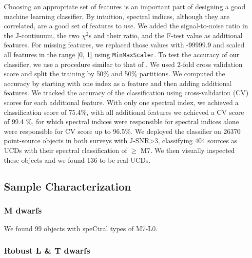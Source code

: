\documentclass[manuscript]{aastex63}
\begin{document}
Choosing an appropriate set of features is an important part of designing a good machine learning classifier. By intuition, spectral indices, although they are correlated, are a good set of features to use. We added the signal-to-noise ratio in the J-continuum, the two $\chi^2$s and their ratio, and the F-test value as additional features. For missing features, we replaced those values with -99999.9 and scaled all features in the range [0, 1] using \texttt{MinMaxScaler}. To test the accuracy of our classifier, we use a procedure similar to that of \citep{2017AJ....153...73M}. We used 2-fold cross validation score and split the training by 50\% and 50\% partitions. We computed the accuracy by starting with one index as a feature and then adding additional features. We tracked the accuracy of the classification using cross-validation (CV) scores for each additional feature. With only one spectral index, we achieved a classification score of 75.4\%, with all additional features we achieved a CV score of 99.4 \%, for which spectral indices were responsible for spectral indices alone were responsible for CV score up to 96.5\%. We deployed the classifier on 26370 point-source objects in both surveys with J-SNR\textgreater 3, classifying 404 sources as UCDs with their spectral classification of $\geq$ M7. We then visually inspected these objects and we found 136 to be real UCDs.


\subsection{Sample Characterization}\label{sec:results}

\subsubsection{M dwarfs}
We found 99 objects with speCtral types of M7-L0. 

\subsubsection{ Robust L \& T dwarfs}
\end{document}
